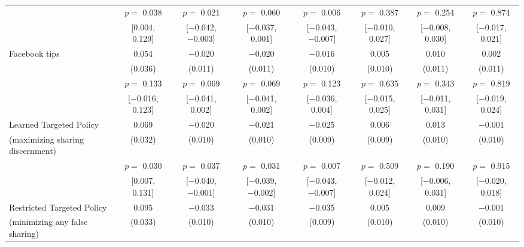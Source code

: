 \begin{tabular}[t]{lccccccc}
 & $p =$ \num{0.038} & $p =$ \num{0.021} & $p =$ \num{0.060} & $p =$ \num{0.006} & $p =$ \num{0.387} & $p =$ \num{0.254} & $p =$ \num{0.874}\\
 & {}[\num{0.004}, \num{0.129}] & {}[\num{-0.042}, \num{-0.003}] & {}[\num{-0.037}, \num{0.001}] & {}[\num{-0.043}, \num{-0.007}] & {}[\num{-0.010}, \num{0.027}] & {}[\num{-0.008}, \num{0.030}] & {}[\num{-0.017}, \num{0.021}]\\
\hspace{1em}Facebook tips & \num{0.054} & \num{-0.020} & \num{-0.020} & \num{-0.016} & \num{0.005} & \num{0.010} & \num{0.002}\\
 & (\num{0.036}) & (\num{0.011}) & (\num{0.011}) & (\num{0.010}) & (\num{0.010}) & (\num{0.011}) & (\num{0.011})\\
 & $p =$ \num{0.133} & $p =$ \num{0.069} & $p =$ \num{0.069} & $p =$ \num{0.123} & $p =$ \num{0.635} & $p =$ \num{0.343} & $p =$ \num{0.819}\\
 & {}[\num{-0.016}, \num{0.123}] & {}[\num{-0.041}, \num{0.002}] & {}[\num{-0.041}, \num{0.002}] & {}[\num{-0.036}, \num{0.004}] & {}[\num{-0.015}, \num{0.025}] & {}[\num{-0.011}, \num{0.031}] & {}[\num{-0.019}, \num{0.024}]\\
\hspace{1em}Learned Targeted Policy & \num{0.069} & \num{-0.020} & \num{-0.021} & \num{-0.025} & \num{0.006} & \num{0.013} & \num{-0.001}\\
 \hspace{1.5em}(maximizing sharing discernment) & (\num{0.032}) & (\num{0.010}) & (\num{0.010}) & (\num{0.009}) & (\num{0.009}) & (\num{0.010}) & (\num{0.010})\\
 & $p =$ \num{0.030} & $p =$ \num{0.037} & $p =$ \num{0.031} & $p =$ \num{0.007} & $p =$ \num{0.509} & $p =$ \num{0.190} & $p =$ \num{0.915}\\
 & {}[\num{0.007}, \num{0.131}] & {}[\num{-0.040}, \num{-0.001}] & {}[\num{-0.039}, \num{-0.002}] & {}[\num{-0.043}, \num{-0.007}] & {}[\num{-0.012}, \num{0.024}] & {}[\num{-0.006}, \num{0.031}] & {}[\num{-0.020}, \num{0.018}]\\
\hspace{1em}Restricted Targeted Policy & \num{0.095} & \num{-0.033} & \num{-0.031} & \num{-0.035} & \num{0.005} & \num{0.009} & \num{-0.001}\\
 \hspace{1.5em}(minimizing any false sharing) & (\num{0.033}) & (\num{0.010}) & (\num{0.010}) & (\num{0.009}) & (\num{0.010}) & (\num{0.010}) & (\num{0.010})\\

\end{tabular}
